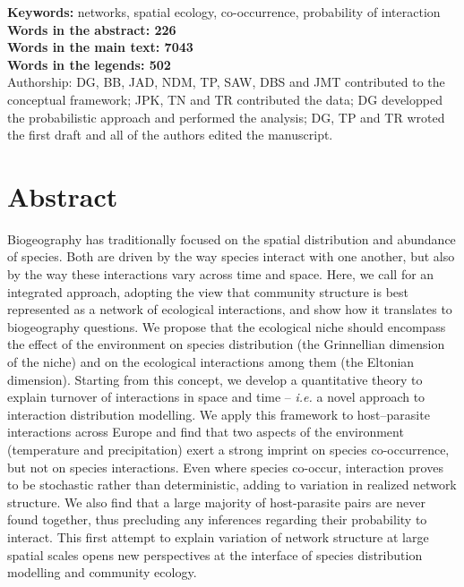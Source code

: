 \documentclass[12pt]{article}
\begin{document}
\textbf{Keywords:} networks, spatial ecology, co-occurrence, probability of interaction\\
\textbf{Words in the abstract: 226} \\ 
\textbf{Words in the main text: 7043} \\
\textbf{Words in the legends: 502} \\

Authorship: DG, BB, JAD, NDM, TP, SAW, DBS and JMT contributed to the conceptual framework; JPK, TN and TR contributed the data; DG developped the probabilistic approach and performed the analysis; DG, TP and TR wroted the first draft and all of the authors edited the manuscript. 

\newpage
\doublespacing

\section*{Abstract}

Biogeography has traditionally focused on the spatial distribution and
abundance of species. Both are driven by the way species interact with one
another, but also by the way these interactions vary across time and space.
Here, we call for an integrated approach, adopting the view that community
structure is best represented as a network of ecological interactions, and
show how it translates to biogeography questions. We propose that the
ecological niche should encompass the effect of the environment
on species distribution (the Grinnellian dimension of the niche) and on the
ecological interactions among them (the Eltonian dimension). Starting from
this concept, we develop a quantitative theory to explain turnover of
interactions in space and time -- \emph{i.e.} a novel approach to interaction
distribution modelling. We apply this framework to host–parasite interactions
across Europe and find that two aspects of the environment (temperature and
precipitation) exert a strong imprint on species co-occurrence, but not on
species interactions. Even where species co-occur, interaction proves to be
stochastic rather than deterministic, adding to variation in realized network
structure. We also find that a large majority of host-parasite pairs are never
found together, thus precluding any inferences regarding their probability to
interact. This first attempt to explain variation of network structure at
large spatial scales opens new perspectives at the interface of species
distribution modelling and community ecology.
\end{document}
